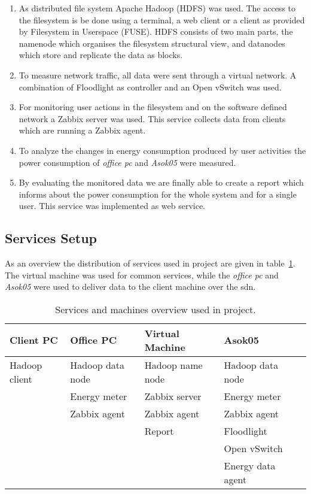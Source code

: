 \begin{enumerate}

\item As distributed file system Apache Hadoop (HDFS) was used. The access to the filesystem is be done using a terminal, a web client or a client as provided by Filesystem in Userspace (FUSE). HDFS consists of two main parts, the namenode which organises the filesystem structural view, and datanodes which store and replicate the data as blocks.

\item To measure network traffic, all data were sent through a virtual network. A combination of Floodlight as controller and an Open vSwitch was used. 

\item For monitoring user actions in the filesystem and on the software defined network a Zabbix server was used. This service collects data from clients which are running a Zabbix agent.

\item To analyze the changes in energy consumption produced by user activities the power consumption of \textit{office pc} and \textit{Asok05} were measured.

\item By evaluating the monitored data we are finally able to create a  report which informs about the power consumption for the whole system and for a single user. This service was implemented as web service.

\end{enumerate}

\subsection{Services Setup}

As an overview the distribution of services used in project are given in table~\ref{tab:services}. The virtual machine was used for common services, while the \textit{office pc} and \textit{Asok05} were used to deliver data to the client machine over the sdn.

\begin{table}[b]
	\centering
	\caption{Services and machines overview used in project. }
	\begin{tabular}{|l|l|l|l|l|}
		\hline \rule[-2ex]{0pt}{5.5ex} \textbf{Client PC} & \textbf{Office PC} & \textbf{Virtual Machine} & \textbf{Asok05} \\ 
		\hline \rule[-2ex]{0pt}{5.5ex} Hadoop client & Hadoop data node & Hadoop name node & Hadoop data node \\ 
		       \rule[-2ex]{0pt}{5.5ex}  & Energy meter & Zabbix server & Energy meter \\ 
		       \rule[-2ex]{0pt}{5.5ex}  & Zabbix agent & Zabbix agent & Zabbix agent \\ 
		       \rule[-2ex]{0pt}{5.5ex}  &  & Report & Floodlight \\ 
		       \rule[-2ex]{0pt}{5.5ex}  &  &  & Open vSwitch \\ 
		       \rule[-2ex]{0pt}{5.5ex}  &  &  & Energy data agent \\ 
		\hline 
	\end{tabular}
	\label{tab:services}
\end{table}

